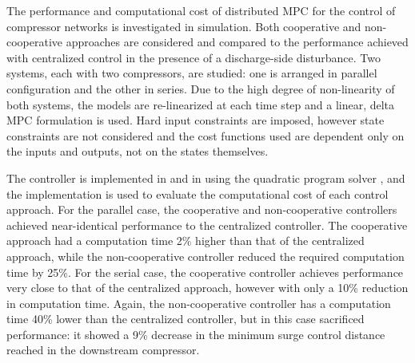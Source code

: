 The performance and computational cost of distributed MPC for the control of compressor networks is investigated in simulation.
Both cooperative and non-cooperative approaches are considered and compared to the performance achieved with centralized control in the presence of a discharge-side disturbance.
Two systems, each with two compressors, are studied: one is arranged in parallel configuration and the other in series.
Due to the high degree of non-linearity of both systems, the models are re-linearized at each time step and a linear, delta MPC formulation is used.
Hard input constraints are imposed, however state constraints are not considered and the cost functions used are dependent only on the inputs and outputs, not on the states themselves.

The controller is implemented in \slink{} and in \cpp{} using the quadratic program solver \qpoases{}, and the \cpp{} implementation is used to evaluate the computational cost of each control approach.
For the parallel case, the cooperative and non-cooperative controllers achieved near-identical performance to the centralized controller.
The cooperative approach had a computation time 2\% higher than that of the centralized approach, while the non-cooperative controller reduced the required computation time by 25\%.
For the serial case, the cooperative controller achieves performance very close to that of the centralized approach, however with only a 10\% reduction in computation time.
Again, the non-cooperative controller has a computation time 40\% lower than the centralized controller, but in this case sacrificed performance: it showed a 9\% decrease in the minimum surge control distance reached in the downstream compressor.

